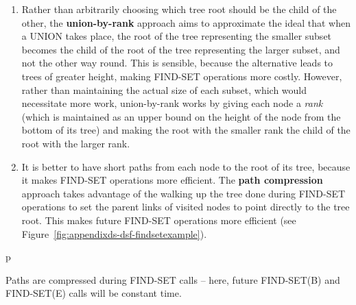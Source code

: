 \begin{enumerate}

\item Rather than arbitrarily choosing which tree root should be the child of the other, the \textbf{union-by-rank} approach aims to approximate the ideal that when a UNION takes place, the root of the tree representing the smaller subset becomes the child of the root of the tree representing the larger subset, and not the other way round. This is sensible, because the alternative leads to trees of greater height, making FIND-SET operations more costly. However, rather than maintaining the actual size of each subset, which would necessitate more work, union-by-rank works by giving each node a \emph{rank} (which is maintained as an upper bound on the height of the node from the bottom of its tree) and making the root with the smaller rank the child of the root with the larger rank.

\item It is better to have short paths from each node to the root of its tree, because it makes FIND-SET operations more efficient. The \textbf{path compression} approach takes advantage of the walking up the tree done during FIND-SET operations to set the parent links of visited nodes to point directly to the tree root. This makes future FIND-SET operations more efficient (see Figure~\ref{fig:appendixds-dsf-findsetexample}).

\end{enumerate}

\begin{stusubfig}{p}
	\hspace{4mm}%
\caption{Paths are compressed during FIND-SET calls -- here, future FIND-SET(B) and FIND-SET(E) calls will be constant time.}
\label{fig:appendixds-dsf-findsetexample}
\end{stusubfig}

